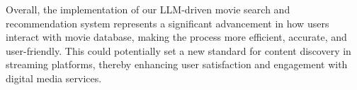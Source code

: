 \documentclass[journal]{IEEEtran}
\theoremstyle{mydefstyle}
\begin{document}
Overall, the implementation of our LLM-driven movie search and recommendation system represents a significant advancement in how users interact with movie database, making the process more efficient, accurate, and user-friendly. This could potentially set a new standard for content discovery in streaming platforms, thereby enhancing user satisfaction and engagement with digital media services.

\end{document}
